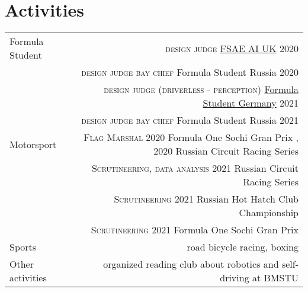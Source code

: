 \section*{Activities}
\begin{tabular}{@{}L!{\VRule}R}
    
    Formula Student & {\textsc{design judge}} \href{https://www.imeche.org/events/formula-student/team-information/fs-ai}{FSAE AI UK} 2020 \\
                    & {\textsc{design judge bay chief}} Formula Student Russia 2020 \\
                    & {\textsc{design judge (driverless - perception)}} \href{https://www.formulastudent.de/fsg/}{Formula Student Germany} 2021 \\
                    & {\textsc{design judge bay chief}} Formula Student Russia 2021 \\ 
    Motorsport      & {\textsc{Flag Marshal}} 2020 Formula One Sochi Gran Prix , 2020 Russian Circuit Racing Series \\
                    & {\textsc{Scrutineering, data analysis}} 2021 Russian Circuit Racing Series \\
                    & {\textsc{Scrutineering}} 2021 Russian Hot Hatch Club Championship \\ 
                    & {\textsc{Scrutineering}} 2021 Formula One Sochi Gran Prix \\
    Sports   & road bicycle racing, boxing \\
    Other activities & organized reading club about robotics and self-driving at BMSTU
\end{tabular}